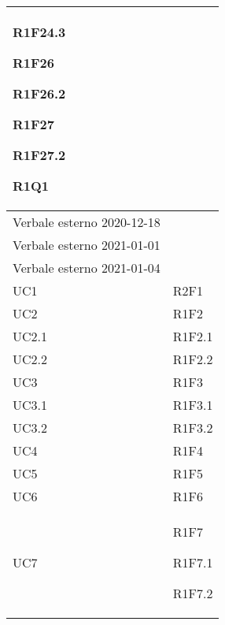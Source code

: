 \begin{center}
\begin{longtable}{|p{44mm}|p{22mm}|}
R1F24.3 \newline

R1F26 \newline

R1F26.2 \newline

R1F27 \newline

R1F27.2 \newline

R1Q1 \newline
\\
\hline
Verbale esterno 2020-12-18 &
\\
\hline
Verbale esterno 2021-01-01 &
\\
\hline
Verbale esterno 2021-01-04 &
\\
\hline
UC1 &
R2F1 \newline
\\
\hline
UC2 &

R1F2 \newline
\\
\hline
UC2.1 &

R1F2.1 \newline
\\
\hline
UC2.2 &

R1F2.2 \newline
\\
\hline
UC3 &

R1F3 \newline
\\
\hline
UC3.1 &

R1F3.1 \newline
\\
\hline
UC3.2 &

R1F3.2 \newline
\\
\hline
UC4 &

R1F4 \newline
\\
\hline
UC5 &

R1F5 \newline
\\
\hline
UC6 &

R1F6 \newline
\\
\hline
UC7 &

R1F7 \newline

R1F7.1 \newline

R1F7.2 \newline


\end{longtable}
\end{center}
